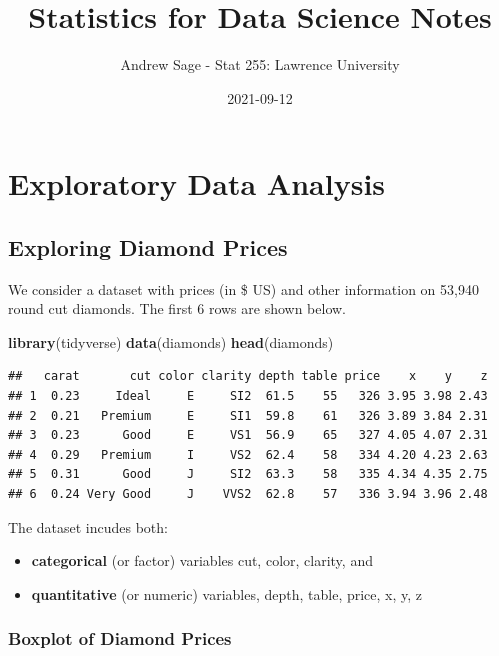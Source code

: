 \documentclass[]{book}
\title{Statistics for Data Science Notes}
\author{Andrew Sage - Stat 255: Lawrence University}
\date{2021-09-12}
\newenvironment{Shaded}{\begin{snugshade}}{\end{snugshade}}
\newcommand{\KeywordTok}[1]{\textcolor[rgb]{0.13,0.29,0.53}{\textbf{#1}}}
\newcommand{\NormalTok}[1]{#1}
\providecommand{\tightlist}{%
  \setlength{\itemsep}{0pt}\setlength{\parskip}{0pt}}
\begin{document}
\maketitle

{
\setcounter{tocdepth}{1}
\tableofcontents
}
\chapter{Exploratory Data Analysis}\label{exploratory-data-analysis}

\section{Exploring Diamond Prices}\label{exploring-diamond-prices}

We consider a dataset with prices (in \$ US) and other information on
53,940 round cut diamonds. The first 6 rows are shown below.

\begin{Shaded}
\begin{Highlighting}[]
\KeywordTok{library}\NormalTok{(tidyverse)}
\KeywordTok{data}\NormalTok{(diamonds)}
\KeywordTok{head}\NormalTok{(diamonds)}
\end{Highlighting}
\end{Shaded}

\begin{verbatim}
##   carat       cut color clarity depth table price    x    y    z
## 1  0.23     Ideal     E     SI2  61.5    55   326 3.95 3.98 2.43
## 2  0.21   Premium     E     SI1  59.8    61   326 3.89 3.84 2.31
## 3  0.23      Good     E     VS1  56.9    65   327 4.05 4.07 2.31
## 4  0.29   Premium     I     VS2  62.4    58   334 4.20 4.23 2.63
## 5  0.31      Good     J     SI2  63.3    58   335 4.34 4.35 2.75
## 6  0.24 Very Good     J    VVS2  62.8    57   336 3.94 3.96 2.48
\end{verbatim}

The dataset incudes both:

\begin{itemize}
\tightlist
\item
  \textbf{categorical} (or factor) variables cut, color, clarity, and\\
\item
  \textbf{quantitative} (or numeric) variables, depth, table, price, x,
  y, z
\end{itemize}

\subsection{Boxplot of Diamond Prices}\label{boxplot-of-diamond-prices}
\end{document}
